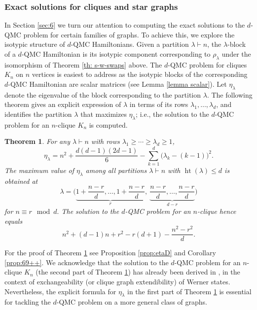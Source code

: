 \documentclass[12pt,dvipsnames,accepted=2016-08-18,a4paper,onecolumn]{quantumarticle}
\DeclareMathOperator{\het}{ht}
\numberwithin{equation}{section}
\newtheorem{theorem}{Theorem}[section]
\theoremstyle{definition}
\begin{document}
\subsubsection{Exact solutions for cliques and star graphs}
In Section \ref{sec:6} we turn our attention to computing the exact solutions to the $d$-QMC problem for certain families of graphs. To achieve this, we explore the isotypic structure of $d$-QMC Hamiltonians. Given a partition $\lambda\vdash n$, the $\lambda$-block of a $d$-QMC Hamiltonian is its isotypic component corresponding to $\rho_\lambda$ under the isomorphism of Theorem \ref{th: s-w-swaps} above.
The $d$-QMC problem for cliques $K_n$ on $n$ vertices is easiest to address as the isotypic blocks of the corresponding $d$-QMC Hamiltonian are scalar matrices (see Lemma \ref{lemma scalar}). Let $\eta_\lambda$ denote the eigenvalue of the block corresponding to the partition $\lambda.$ The following theorem gives an explicit expression of $\lambda$ in terms of its rows $\lambda_1,\ldots,\lambda_d$, and identifies the partition $\lambda$ that maximizes $\eta_\lambda$; i.e., the solution to the $d$-QMC problem for an $n$-clique $K_n$ is computed.

\begin{theorem}\label{th:clique}
    For any $\lambda \vdash n$ with rows $\lambda_1\ge\cdots\ge \lambda_d\geq 1$,
\begin{equation*}
\eta_\lambda=
n^2 +\frac{d(d-1)(2d-1)}{6}
-\sum_{k=1}^d\big( \lambda_k - (k-1)\big)^2.
\end{equation*}
The maximum value of $\eta_\lambda$ among all partitions $\lambda\vdash n$ with $\het(\lambda)\leq d$ is obtained at
	\begin{equation*}
	\lambda=\Big( 
\underbrace{1+\frac{n-r}d, \ldots, 1+\frac{n-r}d}_{r},\ 
\underbrace{\frac{n-r}d, \ldots, \frac{n-r}d}_{d-r}
	\Big)
	\end{equation*}
	for $n\equiv r\mod d.$ The solution to the $d$-QMC problem for an $n$-clique hence equals 
 \begin{equation*}
	     n^2 + (d-1) n + r^2 - r(d+1) - \frac{n^2-r^2}{d}.
	\end{equation*}
\end{theorem}
For the proof of Theorem \ref{th:clique} see Proposition \ref{prop:etaD}
and   Corollary \ref{prop:69++}.
We acknowledge that the solution to the $d$-QMC problem for an $n$-clique $K_n$ (the second part of Theorem \ref{th:clique}) has already been derived in \cite[Theorem 4.1]{grinko}, in the context of exchangeability (or clique graph extendibility) of Werner states. Nevertheless, the explicit formula for $\eta_\lambda$ in the first part of Theorem \ref{th:clique} is essential for tackling the $d$-QMC problem on a more general class of graphs.
\end{document}
